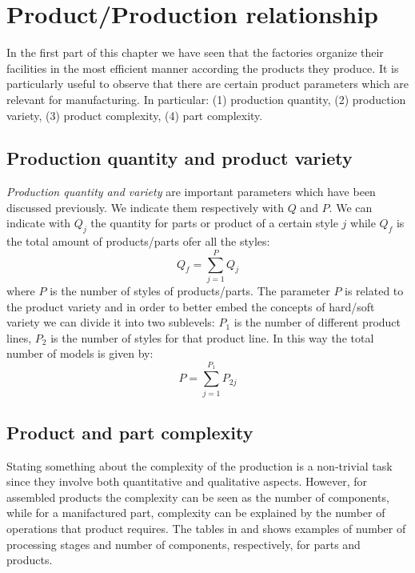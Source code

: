 \section{Product/Production relationship}
In the first part of this chapter we have seen that the factories organize their facilities in the most efficient manner according the products they produce. It is particularly useful to observe that there are certain product parameters which are relevant for manufacturing. In particular: (1) production quantity, (2) production variety, (3) product complexity, (4) part complexity. 

\subsection{Production quantity and product variety}
\textit{Production quantity and variety} are important parameters which have been discussed previously. We indicate them respectively with $Q$ and $P$. We can indicate with $Q_j$ the quantity for parts or product of a certain style $j$ while $Q_f$ is the total amount of products/parts ofer all the styles: 
\begin{equation}
    Q_f=\sum_{j=1}^P {Q_j}
\end{equation}
where $P$ is the number of styles of products/parts. The parameter $P$ is related to the product variety and  in order to better embed the concepts of hard/soft variety we can divide it into two sublevels: $P_1$ is the number of different product lines, $P_2$ is the number of styles for that product line. In this way the total number of models is given by: 
\begin{equation}
    P=\sum_{j=1}^{P_1}{P_{2j}}
\end{equation}

\subsection{Product and part complexity}
Stating something about the complexity of the production is a non-trivial task since they involve both quantitative and qualitative aspects. However, for assembled products the complexity can be seen as the number of components, while for a manifactured part, complexity can be explained by the number of operations that product requires. 
The tables in  and  shows examples of number of processing stages and number of components, respectively, for parts and products.

